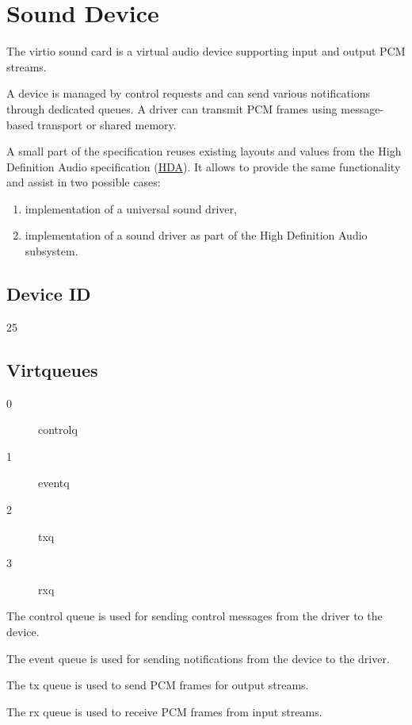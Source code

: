\section{Sound Device}\label{sec:Device Types / Sound Device}

The virtio sound card is a virtual audio device supporting input and output PCM
streams.

A device is managed by control requests and can send various notifications
through dedicated queues. A driver can transmit PCM frames using message-based
transport or shared memory.

A small part of the specification reuses existing layouts and values from the
High Definition Audio specification (\hyperref[intro:HDA]{HDA}). It allows to
provide the same functionality and assist in two possible cases:

\begin{enumerate}
\item implementation of a universal sound driver,
\item implementation of a sound driver as part of the High Definition Audio
subsystem.
\end{enumerate}

\subsection{Device ID}\label{sec:Device Types / Sound Device / Device ID}

25

\subsection{Virtqueues}\label{sec:Device Types / Sound Device / Virtqueues}

\begin{description}
\item[0] controlq
\item[1] eventq
\item[2] txq
\item[3] rxq
\end{description}

The control queue is used for sending control messages from the driver to
the device.

The event queue is used for sending notifications from the device to the driver.

The tx queue is used to send PCM frames for output streams.

The rx queue is used to receive PCM frames from input streams.

